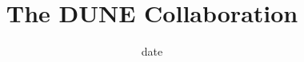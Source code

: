 \documentclass{article}
\title{The DUNE Collaboration}
\date{ {{ date }} }
\begin{document}
\renewcommand\Authfont{\small}
\renewcommand\Affilfont{\itshape}
\maketitle %
\end{document}
